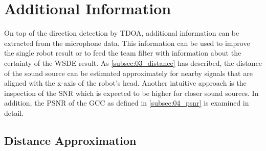 \section{Additional Information}
\label{sec:04_additionalInformation}

On top of the direction detection by \ac{TDOA}, additional information can be
extracted from the microphone data.
This information can be used to improve the single robot result or
to feed the team filter with information about the certainty of the \ac{WSDE} result.
As \cref{subsec:03_distance} has described, the distance of the sound source
can be estimated approximately for nearby signals that are aligned with
the x-axis of the robot's head.
Another intuitive approach is the inspection of the \ac{SNR} which
is expected to be higher for closer sound sources.
In addition, the \ac{PSNR} of the \ac{GCC} as defined in \cref{subsec:04_psnr} is
examined in detail.

\subsection{Distance Approximation}
\label{subsec:04_distance}

